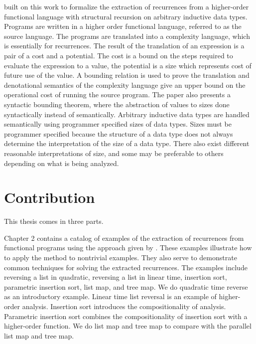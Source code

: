 \citet{Danner2015} built on this work to formalize the extraction
of recurrences from a higher-order functional language with structural
recursion on arbitrary inductive data types. Programs are written in a higher
order functional language, referred to as the source language. The programs are
translated into a complexity language, which is essentially for recurrences.
The result of the translation of an expression is a pair of a cost and a
potential. The cost is a bound on the steps required to evaluate the expression
to a value, the potential is a size which represents cost of future use of the
value. A bounding relation is used to prove the translation and denotational
semantics of the complexity language give an upper bound on the operational
cost of running the source program. The paper also presents a syntactic
bounding theorem, where the abstraction of values to sizes done syntactically
instead of semantically.  Arbitrary inductive data types are handled
semantically using programmer specified sizes of data types. Sizes must be
programmer specified because the structure of a data type does not always
determine the interpretation of the size of a data type. There also exist
different reasonable interpretations of size, and some may be preferable to
others depending on what is being analyzed.


\section{Contribution}

This thesis comes in three parts.



Chapter 2 contains a catalog of examples of the extraction of recurrences
from functional programs using the approach given by \citet{Danner2015}. These
examples illustrate how to apply the method to nontrivial examples. They also
serve to demonstrate common techniques for solving the extracted recurrences.
The examples include reversing a list in quadratic, reversing a list in linear
time, insertion sort, parametric insertion sort, list map, and tree map. We do
quadratic time reverse as an introductory example. Linear time list reversal is
an example of higher-order analysis. Insertion sort introduces the
compositionality of analysis. Parametric insertion sort combines the
compositionality of insertion sort with a higher-order function. We do list map
and tree map to compare with the parallel list map and tree map.




